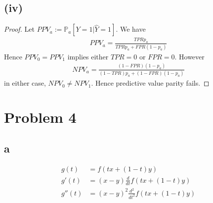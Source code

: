 \documentclass[twoside,11pt]{homework}
\begin{document}
\subsection*{(iv)}
	\begin{proof}
		Let $PPV_a := \mathbb{P}_a[Y=1 | \hat{Y}=1]$. We have
		\begin{align*}
			PPV_a = \frac{TPR p_a}{TPR p_a+FPR(1-p_a)}
		\end{align*}
		Hence $PPV_0=PPV_1$ implies either $TPR=0$ or $FPR=0$. However
		\begin{align*}
			NPV_a = \frac{(1-FPR) (1-p_a)}{(1-TPR) p_a+(1-FPR)(1-p_a)}
		\end{align*}
		in either case, $NPV_0\neq NPV_1$. Hence predictive value parity fails.
	\end{proof}

\section*{Problem 4}
\subsection*{a}
\begin{align*}
	g(t) &= f(tx+(1-t)y)\\
	g'(t) &= (x-y) \frac{d}{dt} f(tx+(1-t)y)\\
	g''(t) &= (x-y)^2\frac{d^2}{dt^2} f(tx+(1-t)y)\\
\end{align*}
\end{document}

